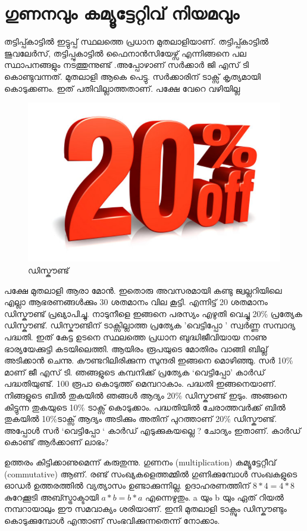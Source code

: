 \documentclass[10pt,a4paper]{report}
\begin{document}
\section{ഗുണനവും കമ്യൂട്ടേറ്റിവ് നിയമവും}  
  തട്ടിപ്പ്കാട്ടിൽ ഇട്ടുപ്പ് സ്ഥലത്തെ പ്രധാന മുതലാളിയാണ്. തട്ടിപ്പ്കാട്ടിൽ ജുവലേർസ്, തട്ടിപ്പുകാട്ടിൽ ഫൈനാൻസിയേഴ്സ് എന്നിങ്ങനെ പല സ്ഥാപനങ്ങളും നടത്തുന്നുണ്ട് .അപ്പോഴാണ് സർക്കാർ ജി എസ് ടി കൊണ്ടുവന്നത്. മുതലാളി ആകെ പെട്ടു. സർക്കാരിന് ടാക്സ് കൃത്യമായി കൊടുക്കണം. ഇത് പതിവില്ലാത്തതാണ്. പക്ഷേ വേറെ വഴിയില്ല 
\begin{figure}[H]
  \center
\includegraphics[scale=.25]{images/20}
\caption{ഡിസ്കൗണ്ട്}
\label{discount}
\end{figure}
  പക്ഷേ മുതലാളി ആരാ മോൻ. ഇതൊരു അവസരമായി കണ്ടു ജ്വല്ലറിയിലെ എല്ലാ ആഭരണങ്ങൾക്കും 30 ശതമാനം വില കൂട്ടി. എന്നിട്ട് 20 ശതമാനം ഡിസ്കൗണ്ട് പ്രഖ്യാപിച്ചു. നാടുനീളെ ഇങ്ങനെ പരസ്യം എഴുതി വെച്ചു 20\% പ്രത്യേക ഡിസ്കൗണ്ട്. ഡിസ്കൗണ്ടിന് ടാക്സില്ലാത്ത പ്രത്യേക 'വെട്ടിപ്പോ ' സ്വർണ്ണ സമ്പാദ്യ പദ്ധതി. ഇത് കേട്ട ഉടനെ സ്ഥലത്തെ പ്രധാന ബുദ്ധിജീവിയായ നാണു ഭാര്യയേക്കുട്ടി കടയിലെത്തി. ആയിരം രൂപയുടെ മോതിരം വാങ്ങി ബില്ല് അടിക്കാൻ ചെന്നു. കൗണ്ടറിലിരിക്കുന്ന സുന്ദരി ഇങ്ങനെ മൊഴിഞ്ഞു. സർ 10\% മാണ് ജീ എസ് ടി. ഞങ്ങളുടെ കമ്പനിക്ക് പ്രത്യേക ‘വെട്ടിപ്പോ' കാർഡ് പദ്ധതിയുണ്ട്. 100 രൂപാ കൊടുത്ത് മെമ്പറാകാം. പദ്ധതി ഇങ്ങനെയാണ്. നിങ്ങളുടെ ബിൽ തുകയിൽ ഞങ്ങൾ ആദ്യം 20\% ഡിസ്കൗണ്ട് ഇടും. അങ്ങനെ കിട്ടുന്ന തുകയുടെ 10\% ടാക്സ് കൊടുക്കാം. പദ്ധതിയിൽ ചേരാത്തവർക്ക് ബിൽ തുകയിൽ 10\%ടാക്സ് ആദ്യം അടിക്കും അതിന് പുറത്താണ് 20\% ഡിസ്കൗണ്ട്. അപ്പോൾ സർ ‘വെട്ടിപ്പോ ‘ കാർഡ് എടുക്കുകയല്ലെ ? ചോദ്യം ഇതാണ്. കാർഡ് കൊണ്ട് ആർക്കാണ് ലാഭം? 
  
  ഉത്തരം കിട്ടിക്കാണുമെന്ന് കരുതുന്നു. ഗുണനം (multiplication) കമ്യൂട്ടേറ്റീവ് (commutative) ആണ്. രണ്ട് സംഖ്യകളെത്തമ്മിൽ ഗുണിക്കുമ്പോൾ സംഖകളുടെ ഓഡർ ഉത്തരത്തിൽ വ്യത്യാസം ഉണ്ടാക്കുന്നില്ല. ഉദാഹരണത്തിന് $8 * 4 = 4 * 8$ കുറേക്കൂടി അബ്സ്ട്രാക്ടായി $a * b = b * a$ എന്നെഴുതും. a യും b യും ഏത് റിയൽ നമ്പറായാലും ഈ സമവാക്യം ശരിയാണ്. ഇനി മുതലാളി ടാക്സും ഡിസ്കൗണ്ടും കൊടുക്കുമ്പോൾ എന്താണ് സംഭവിക്കുന്നതെന്ന് നോക്കാം. 
  
\end{document}
